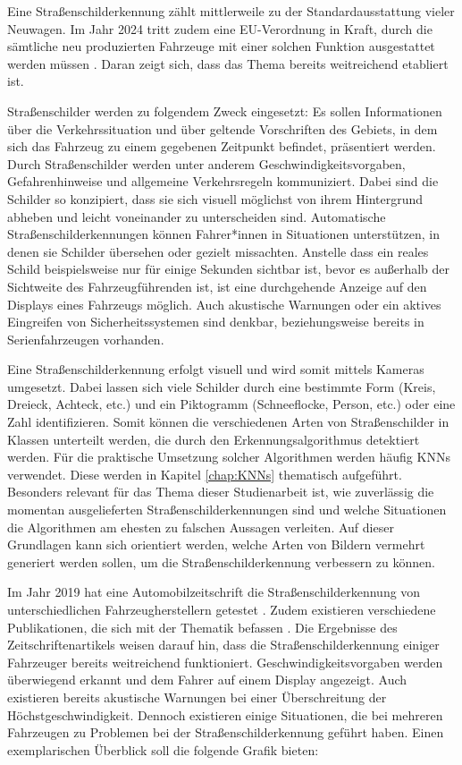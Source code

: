 \label{chap:stand-der-technik-strassenschilderkennung}
Eine Straßenschilderkennung zählt mittlerweile zu der Standardausstattung vieler Neuwagen. Im Jahr 2024 tritt zudem eine EU-Verordnung in Kraft, durch die sämtliche neu produzierten Fahrzeuge mit einer solchen Funktion ausgestattet werden müssen \cite{eu-regulation}. Daran zeigt sich, dass das Thema bereits weitreichend etabliert ist.

Straßenschilder werden zu folgendem Zweck eingesetzt: Es sollen Informationen über die Verkehrssituation und über geltende Vorschriften des Gebiets, in dem sich das Fahrzeug zu einem gegebenen Zeitpunkt befindet, präsentiert werden. Durch Straßenschilder werden unter anderem Geschwindigkeitsvorgaben, Gefahrenhinweise und allgemeine Verkehrsregeln kommuniziert. Dabei sind die Schilder so konzipiert, dass sie sich visuell möglichst von ihrem Hintergrund abheben und leicht voneinander zu unterscheiden sind. Automatische Straßenschilderkennungen können Fahrer*innen in Situationen unterstützen, in denen sie Schilder übersehen oder gezielt missachten. Anstelle dass ein reales Schild beispielsweise nur für einige Sekunden sichtbar ist, bevor es außerhalb der Sichtweite des Fahrzeugführenden ist, ist eine durchgehende Anzeige auf den Displays eines Fahrzeugs möglich. Auch akustische Warnungen oder ein aktives Eingreifen von Sicherheitssystemen sind denkbar, beziehungsweise bereits in Serienfahrzeugen vorhanden.

Eine Straßenschilderkennung erfolgt visuell und wird somit mittels Kameras umgesetzt. Dabei lassen sich viele Schilder durch eine bestimmte Form (Kreis, Dreieck, Achteck, etc.) und ein Piktogramm (Schneeflocke, Person, etc.) oder eine Zahl identifizieren. Somit können die verschiedenen Arten von Straßenschilder in Klassen unterteilt werden, die durch den Erkennungsalgorithmus detektiert werden. Für die praktische Umsetzung solcher Algorithmen werden häufig \acp{KNN} verwendet. Diese werden in Kapitel \ref{chap:KNNs} thematisch aufgeführt. Besonders relevant für das Thema dieser Studienarbeit ist, wie zuverlässig die momentan ausgelieferten Straßenschilderkennungen sind und welche Situationen die Algorithmen am ehesten zu falschen Aussagen verleiten. Auf dieser Grundlagen kann sich orientiert werden, welche Arten von Bildern vermehrt generiert werden sollen, um die Straßenschilderkennung verbessern zu können.

Im Jahr 2019 hat eine Automobilzeitschrift die Straßenschilderkennung von unterschiedlichen Fahrzeugherstellern getestet \cite{strassenschilderkennungTest}. Zudem existieren verschiedene Publikationen, die sich mit der Thematik befassen \cite{traffic-sign-detection-review-2014}. Die Ergebnisse des Zeitschriftenartikels weisen darauf hin, dass die Straßenschilderkennung einiger Fahrzeuger bereits weitreichend funktioniert. Geschwindigkeitsvorgaben werden überwiegend erkannt und dem Fahrer auf einem Display angezeigt. Auch existieren bereits akustische Warnungen bei einer Überschreitung der Höchstgeschwindigkeit. Dennoch existieren einige Situationen, die bei mehreren Fahrzeugen zu Problemen bei der Straßenschilderkennung geführt haben. Einen exemplarischen Überblick soll die folgende Grafik bieten: \cite{strassenschilderkennungTest} 

